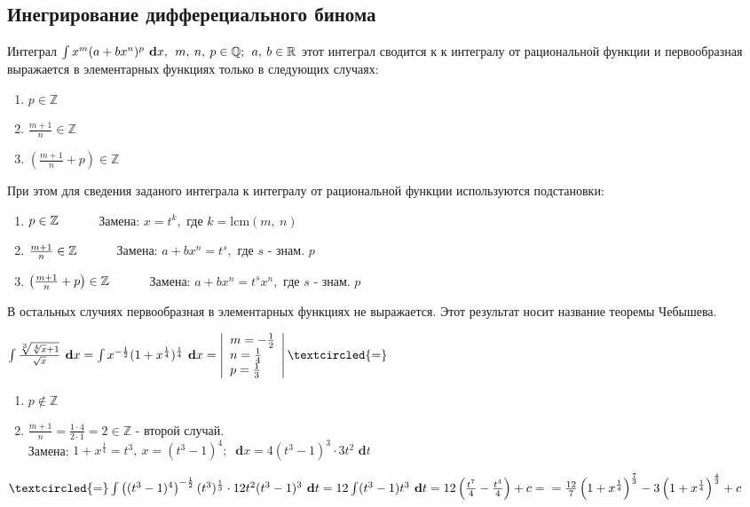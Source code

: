 \documentclass[a4paper,12pt]{bookest}
\theoremstyle{remark}
\newcommand\tab[1][1cm]{\hspace*{#1}}
\newcommand\dx{\textbf{ d}x}
\newcommand\dy{\textbf{ d}}
\newcommand\lcm{\textrm{lcm}}
\begin{document}
\subsection{Инегрирование дифферециального бинома}
Интеграл $\int x^m(a+bx^n)^p\dx,\>\>m,\>n,\>p\in\mathbb{Q};\>\>a,\>b\in\mathbb{R}\\$ этот интеграл сводится к к интегралу от рациональной функции и первообразная выражается в элементарных функциях только в следующих случаях: \begin{enumerate}
	\item $p\in\mathbb{Z}$
	\item $\frac{m+1}{n}\in\mathbb{Z}$
	\item $\left(\frac{m+1}{n}+p\right)\in\mathbb{Z}$ 
\end{enumerate}   
При этом для сведения заданого интеграла к интегралу от рациональной функции используются подстановки: \begin{enumerate}
	\item $p\in\mathbb{Z}\tab $ Замена: $x=t^k,$ где $k=\lcm(m,\>n)$
	\item $\frac{m+1}{n}\in\mathbb{Z}\tab $ Замена: $a+bx^n=t^s,$ где $s$ - знам. $p$
	\item $\left(\frac{m+1}{n}+p\right)\in\mathbb{Z}\tab $ Замена: $a+bx^n=t^sx^n,$ где $s$ - знам. $p$
\end{enumerate}
В остальных случиях первообразная в элементарных функциях не выражается. Этот результат носит название теоремы Чебышева. 
\begin{example}
	$\int\frac{\sqrt[3]{\sqrt[4]{x}+1}}{\sqrt x}\dx=\int x^{-\frac12}(1+x^{\frac14})^{\frac14 }\dx=\left|\begin{array}{l}
		m=-\frac12\\n=\frac14\\p=\frac13
	\end{array}\right|\textcircled{=}$\begin{enumerate}
		\item $p\not\in\mathbb{Z}$
		\item $\frac{m+1}{n}=\frac{1\cdot 4}{2\cdot 1}=2\in\mathbb{Z}$ - второй случай. \\ Замена: $1+x^{\frac14}=t^3,\>x=(t^3-1)^4;\>\dx=4(t^3-1)^3\cdot3t^2\dy t$
	\end{enumerate}
	$\textcircled{=}\int\left((t^3-1)^4\right)^{-\frac12}(t^3)^{\frac13}\cdot 12t^2(t^3-1)^3\dy t=12\int(t^3-1)t^3\dy t=12\left(\frac{t^7}4-\frac{t^4}4\right)+c=\\=\frac{12}7\left(1+x^{\frac14}\right)^{\frac73}-3\left(1+x^{\frac14}\right)^{\frac43}+c$
\end{example}
\end{document}
